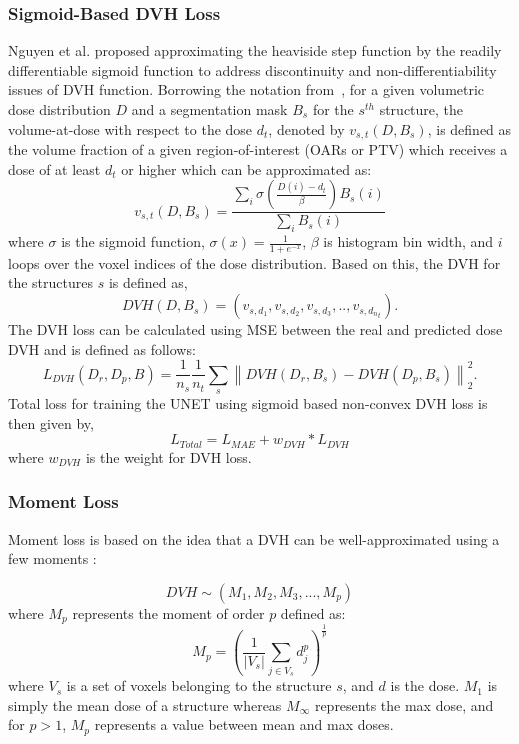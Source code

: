 \documentclass[10pt]{article}
\newcommand{\norm}[1]{\left\lVert#1\right\rVert}
\begin{document}
\subsubsection{Sigmoid-Based DVH Loss}
Nguyen et al. \cite{DVHLoss} proposed approximating the heaviside step function by the readily differentiable sigmoid function to address discontinuity and non-differentiability issues of DVH function. Borrowing the notation from~\cite{DVHLoss}, for a given volumetric dose distribution $D$ and a segmentation mask {$B_s$} for the $s^{th}$ structure, the volume-at-dose with respect to the dose $d_t$, denoted by $v_{s,t}(D,{B_s})$, is defined as the volume fraction of a given region-of-interest (OARs or PTV) which receives a dose of at least $d_t$ or higher which can be approximated as:
\begin{equation}\label{MAE-DVH-loss}
    v_{s,t}(D,{B_s}) = \frac{\sum_i \sigma\left( \frac{D(i) - d_t}{\beta} \right){B_s}(i)}{\sum_i{B_s}(i)}
\end{equation}
where $\sigma$ is the sigmoid function, $\sigma(x) = \frac{1}{1 + e^{-x}}$, $\beta$ is histogram bin width, and $i$ loops over the voxel indices of the dose distribution. {Based on this, the DVH for the structures $s$ is defined as,
\begin{equation}
    DVH(D,{B_s}) = (v_{s,d_1}, v_{s,d_2}, v_{s,d_3}, .., v_{s,{d_n}_t}).
\end{equation}}
The DVH loss can be calculated using MSE between the real and predicted dose DVH and is defined as follows:
\begin{equation}
    L_{DVH}\left( D_r, D_p, B\right) = \frac{1}{n_s} \frac{1}{n_t} \sum_s \norm{DVH\left(D_r,B_s\right) - DVH\left(D_p, B_s\right)}_2^2.
\end{equation}
{
Total loss for training the UNET using sigmoid based non-convex DVH loss is then given by,
\begin{equation}
    L_{Total} = L_{MAE} + w_{DVH}*L_{DVH}
\end{equation}
where $w_{DVH}$ is the weight for DVH loss. }
\subsubsection{Moment Loss}
Moment loss is based on the idea that a DVH can be well-approximated using a few moments \cite{zinchenko2008controlling, zarepisheh2013moment}:

$$ DVH \sim ( M_1, M_2, M_3, ..., M_{p} ) $$
where $M_{p}$ represents the moment of order $p$ defined as:
\begin{equation}
    M_{p} = \left(\frac{1}{|V_s|}\sum_{j\in V_s} d_j^p \right)^\frac{1}{p}
\end{equation}
where $V_s$ is a set of voxels belonging to the structure $s$, and $d$ is the dose. $M_1$ is simply the mean dose of a structure whereas $M_\infty$ represents the max dose, and for $p>1$, $M_{p}$ represents a value between mean and max doses.   
 
\end{document}
